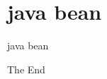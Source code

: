 \documentclass{beamer}
\begin{document}
\section{java bean}
\begin{frame}
\Huge{\centerline{java bean}}
\end{frame}



\begin{frame}
\Huge{\centerline{The End}}
\end{frame}




\end{document}
